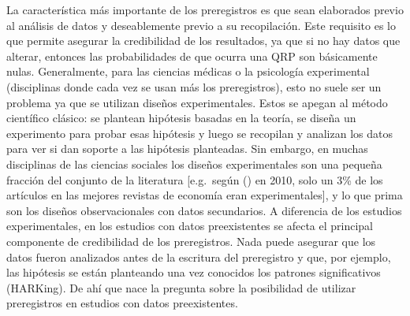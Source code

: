 \documentclass[
  spanish,
  a4paper,
  oneside]{scrbook}
\begin{document}
La característica más importante de los preregistros es que sean
elaborados previo al análisis de datos y deseablemente previo a su
recopilación. Este requisito es lo que permite asegurar la credibilidad
de los resultados, ya que si no hay datos que alterar, entonces las
probabilidades de que ocurra una QRP son básicamente nulas.
Generalmente, para las ciencias médicas o la psicología experimental
(disciplinas donde cada vez se usan más los preregistros), esto no suele
ser un problema ya que se utilizan diseños experimentales. Estos se
apegan al método científico clásico: se plantean hipótesis basadas en la
teoría, se diseña un experimento para probar esas hipótesis y luego se
recopilan y analizan los datos para ver si dan soporte a las hipótesis
planteadas. Sin embargo, en muchas disciplinas de las ciencias sociales
los diseños experimentales son una pequeña fracción del conjunto de la
literatura {[}e.g.~según () en 2010, solo un 3\% de los artículos en
las mejores revistas de economía eran experimentales{]}, y lo que prima
son los diseños observacionales con datos secundarios. A diferencia de
los estudios experimentales, en los estudios con datos preexistentes se
afecta el principal componente de credibilidad de los preregistros. Nada
puede asegurar que los datos fueron analizados antes de la escritura del
preregistro y que, por ejemplo, las hipótesis se están planteando una
vez conocidos los patrones significativos (HARKing). De ahí que nace la
pregunta sobre la posibilidad de utilizar preregistros en estudios con
datos preexistentes.
\end{document}
